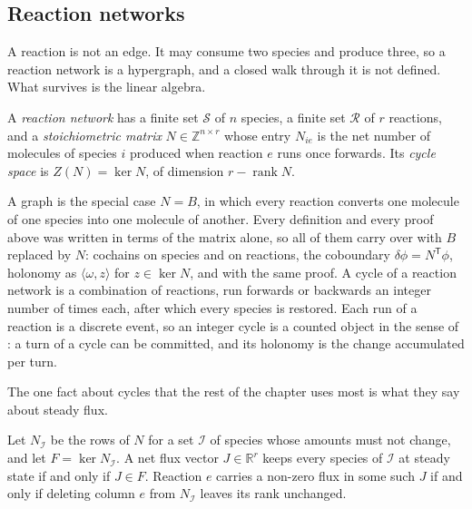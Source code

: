 \subsection{Reaction networks}

A reaction is not an edge. It may consume two species and produce three, so
a reaction network is a hypergraph, and a closed walk through it is not
defined. What survives is the linear algebra.

\begin{definition}
\label{c1:def-network}
A \emph{reaction network} has a finite set $\mathcal S$ of $n$ species, a
finite set $\mathcal R$ of $r$ reactions, and a \emph{stoichiometric matrix}
$N\in\mathbb Z^{n\times r}$ whose entry $N_{ie}$ is the net number of
molecules of species $i$ produced when reaction $e$ runs once forwards.
Its \emph{cycle space} is $Z(N)=\ker N$, of dimension $r-\operatorname{rank}N$.
\end{definition}

A graph is the special case $N=B$, in which every reaction converts one
molecule of one species into one molecule of another. Every definition and
every proof above was written in terms of the matrix alone, so all of them
carry over with $B$ replaced by $N$: cochains on species and on reactions,
the coboundary $\delta\phi=N^{\mathsf T}\phi$, holonomy as
$\langle\omega,z\rangle$ for $z\in\ker N$, and  with the
same proof. \lnkD{} A cycle of a reaction network is a combination of
reactions, run forwards or backwards an integer number of times each, after
which every species is restored. Each run of a reaction is a discrete event,
so an integer cycle is a counted object in the sense of
: a turn of a cycle can be committed, and its holonomy
is the change accumulated per turn.

The one fact about cycles that the rest of the chapter uses most is what
they say about steady flux.

\begin{proposition}
\label{c1:prop-flux}
\lnkD{} Let $N_{\mathcal I}$ be the rows of $N$ for a set $\mathcal I$ of
species whose amounts must not change, and let $F=\ker N_{\mathcal I}$. A
net flux vector $J\in\mathbb R^r$ keeps every species of $\mathcal I$ at
steady state if and only if $J\in F$. Reaction $e$ carries a non-zero flux
in some such $J$ if and only if deleting column $e$ from $N_{\mathcal I}$
leaves its rank unchanged.
\end{proposition}

